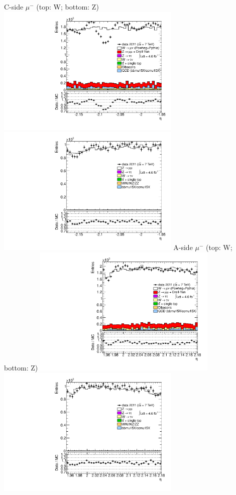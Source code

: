  {
\colb[T]
C-side $\mu^{-}$ (top: W; bottom: Z)
\centering
\includegraphics[width=0.66\textwidth]{dates/20130306/figures/both/WpItoK_10_C_stack_l_eta_NEG} \\
\includegraphics[width=0.66\textwidth]{dates/20130306/figures/both/Z_10_C_stack_lN_eta_ALL.pdf}
A-side $\mu^{-}$ (top: W; bottom: Z)
\centering
\includegraphics[width=0.66\textwidth]{dates/20130306/figures/both/WpItoK_10_A_stack_l_eta_NEG} \\
\includegraphics[width=0.66\textwidth]{dates/20130306/figures/both/Z_10_A_stack_lN_eta_ALL.pdf} 
\cole
}
